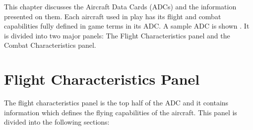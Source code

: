 
\label{rule:aircraft-data-cards}

This chapter discusses the Aircraft Data Cards (ADCs) and the information presented on them. Each aircraft used in play has its flight and combat capabilities fully defined in game terms in its ADC. A sample ADC is shown .  It is divided into two major panels: The Flight Characteristics panel and the Combat Characteristics panel.


\section{Flight Characteristics Panel}


The flight characteristics panel is the top half of the ADC and it contains information which defines the flying capabilities of the aircraft. This panel is divided into the following sections:

